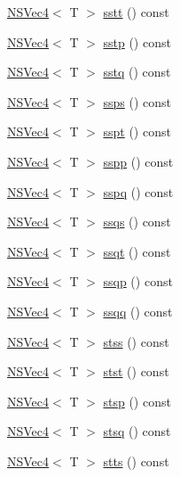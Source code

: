 \begin{DoxyCompactItemize}
\item 
\hyperlink{structNSVec4}{N\-S\-Vec4}$<$ T $>$ \hyperlink{structNSVec4_a84190ca367ec9b5b4fad139e8f600f89}{sstt} () const 
\item 
\hyperlink{structNSVec4}{N\-S\-Vec4}$<$ T $>$ \hyperlink{structNSVec4_a4b7d80fa7b1e19ff59c0eee6e1fb0dbe}{sstp} () const 
\item 
\hyperlink{structNSVec4}{N\-S\-Vec4}$<$ T $>$ \hyperlink{structNSVec4_a02910649a779bd5bcb8ddd08058d4580}{sstq} () const 
\item 
\hyperlink{structNSVec4}{N\-S\-Vec4}$<$ T $>$ \hyperlink{structNSVec4_ad413cfbfc7a0066a3e74ef61d4f1ec4f}{ssps} () const 
\item 
\hyperlink{structNSVec4}{N\-S\-Vec4}$<$ T $>$ \hyperlink{structNSVec4_a07bb2637686312e5002b145781d2e485}{sspt} () const 
\item 
\hyperlink{structNSVec4}{N\-S\-Vec4}$<$ T $>$ \hyperlink{structNSVec4_ad859c649fc5a45cf1d793ac8739aea37}{sspp} () const 
\item 
\hyperlink{structNSVec4}{N\-S\-Vec4}$<$ T $>$ \hyperlink{structNSVec4_a9b6ec8fcd9cc28ecaf1fdae1feef870b}{sspq} () const 
\item 
\hyperlink{structNSVec4}{N\-S\-Vec4}$<$ T $>$ \hyperlink{structNSVec4_a29f417d58ea6f31f3382a03e6e0304e1}{ssqs} () const 
\item 
\hyperlink{structNSVec4}{N\-S\-Vec4}$<$ T $>$ \hyperlink{structNSVec4_a2336dbefdcca9fa7ead8d2b582be66f4}{ssqt} () const 
\item 
\hyperlink{structNSVec4}{N\-S\-Vec4}$<$ T $>$ \hyperlink{structNSVec4_a0c4c017ce4c0dface6c35b1220c1fe9c}{ssqp} () const 
\item 
\hyperlink{structNSVec4}{N\-S\-Vec4}$<$ T $>$ \hyperlink{structNSVec4_af5c62a0fc3ee2b7c30ab82e65ae15226}{ssqq} () const 
\item 
\hyperlink{structNSVec4}{N\-S\-Vec4}$<$ T $>$ \hyperlink{structNSVec4_aa8e11d0bf8e1ee238764699a59068483}{stss} () const 
\item 
\hyperlink{structNSVec4}{N\-S\-Vec4}$<$ T $>$ \hyperlink{structNSVec4_a21e43d9bfb2dc5b7efa4bc9e79ddbf94}{stst} () const 
\item 
\hyperlink{structNSVec4}{N\-S\-Vec4}$<$ T $>$ \hyperlink{structNSVec4_abf639e5d6d33e00f1fe828d57cdd992a}{stsp} () const 
\item 
\hyperlink{structNSVec4}{N\-S\-Vec4}$<$ T $>$ \hyperlink{structNSVec4_a6fc501a6226c339e0c10587c5d91668a}{stsq} () const 
\item 
\hyperlink{structNSVec4}{N\-S\-Vec4}$<$ T $>$ \hyperlink{structNSVec4_a98481ec599f81ef5091bd536951618f2}{stts} () const 

\end{DoxyCompactItemize}
